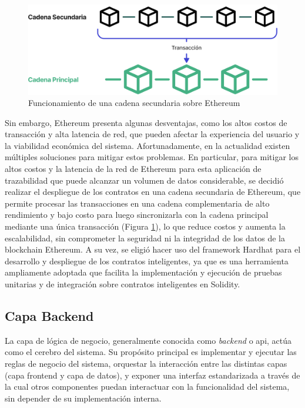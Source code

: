 \begin{figure}[!tb]
    \centering
    \includegraphics[width=0.9\linewidth]{Figures/blockchain-layer-2.png}
    \caption{Funcionamiento de una cadena secundaria sobre Ethereum}
    \label{fig:ethereum-layer-2}
\end{figure}

Sin embargo, Ethereum presenta algunas desventajas, como los altos costos de transacción y alta latencia de red, que pueden afectar la experiencia del usuario y la viabilidad económica del sistema. Afortunadamente, en la actualidad existen múltiples soluciones para mitigar estos problemas. En particular, para mitigar los altos costos y la latencia de la red de Ethereum para esta aplicación de trazabilidad que puede alcanzar un volumen de datos considerable, se decidió realizar el despliegue de los contratos en una cadena secundaria de Ethereum, que permite procesar las transacciones en una cadena complementaria de alto rendimiento y bajo costo para luego sincronizarla con la cadena principal mediante una única transacción (Figura \ref{fig:ethereum-layer-2}), lo que reduce costos y aumenta la escalabilidad, sin comprometer la seguridad ni la integridad de los datos de la blockchain Ethereum. A su vez, se eligió hacer uso del framework Hardhat para el desarrollo y despliegue de los contratos inteligentes, ya que es una herramienta ampliamente adoptada que facilita la implementación y ejecución de pruebas unitarias y de integración sobre contratos inteligentes en Solidity.

\subsection{Capa Backend}

La capa de lógica de negocio, generalmente conocida como \textit{backend} o \acrfull{api}, actúa como el cerebro del sistema. Su propósito principal es implementar y ejecutar las reglas de negocio del sistema, orquestar la interacción entre las distintas capas (capa frontend y capa de datos), y exponer una interfaz estandarizada a través de la cual otros componentes puedan interactuar con la funcionalidad del sistema, sin depender de su implementación interna.

